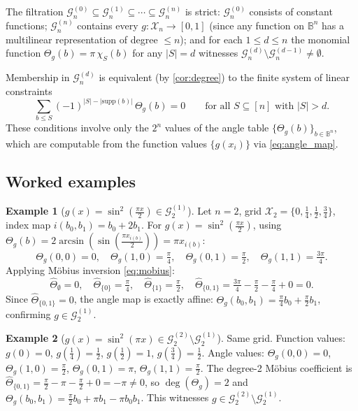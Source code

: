\documentclass[12pt,a4paper]{article}
\theoremstyle{plain}
\theoremstyle{definition}
\newtheorem{example}[example]{Example}
\theoremstyle{remark}
\newcommand{\Gclass}[2]{\mathcal{G}_{#1}^{(#2)}}
\newcommand{\Thetag}{\Theta_g}
\newcommand{\wh}[2]{\hat{#1}_{#2}}
\newcommand{\chimon}[1]{\chi_{#1}}
\begin{document}
The filtration
$\Gclass{n}{0}\subseteq\Gclass{n}{1}\subseteq\cdots\subseteq\Gclass{n}{n}$
is strict: $\Gclass{n}{0}$ consists of constant functions; $\Gclass{n}{n}$
contains every $g:\mathcal{X}_n\to[0,1]$ (since any function on
$\mathbb{B}^n$ has a multilinear representation of degree $\leq n$);
and for each $1\leq d\leq n$ the monomial function
$\Thetag(b) = \pi\,\chimon{S}(b)$ for any $|S|=d$ witnesses
$\Gclass{n}{d}\setminus\Gclass{n}{d-1}\neq\emptyset$.

Membership in $\Gclass{n}{d}$ is equivalent (by \cref{cor:degree}) to
the finite system of linear constraints
\begin{equation}
  \sum_{b\leq S}(-1)^{|S|-|\mathrm{supp}(b)|}\,\Thetag(b) = 0
  \qquad\text{for all }S\subseteq[n]\text{ with }|S|>d.
  \label{eq:membership_conditions}
\end{equation}
These conditions involve only the $2^n$ values of the angle table
$\{\Thetag(b)\}_{b\in\mathbb{B}^n}$, which are computable from the
function values $\{g(x_i)\}$ via \eqref{eq:angle_map}.

\subsection{Worked examples}

\begin{example}[$g(x)=\sin^2(\tfrac{\pi x}{2})\in\Gclass{2}{1}$]
\label{ex:sin2}
Let $n=2$, grid $\mathcal{X}_2=\{0,\tfrac{1}{4},\tfrac{1}{2},\tfrac{3}{4}\}$,
index map $i(b_0,b_1)=b_0+2b_1$.
For $g(x)=\sin^2(\tfrac{\pi x}{2})$, using
$\Thetag(b)=2\arcsin(\sin(\tfrac{\pi x_{i(b)}}{2}))=\pi x_{i(b)}$:
\begin{equation*}
  \Thetag(0,0)=0,\quad
  \Thetag(1,0)=\tfrac{\pi}{4},\quad
  \Thetag(0,1)=\tfrac{\pi}{2},\quad
  \Thetag(1,1)=\tfrac{3\pi}{4}.
\end{equation*}
Applying Möbius inversion \eqref{eq:mobius}:
\begin{equation*}
  \wh{\Theta}{\emptyset}=0,\quad
  \wh{\Theta}{\{0\}}=\tfrac{\pi}{4},\quad
  \wh{\Theta}{\{1\}}=\tfrac{\pi}{2},\quad
  \wh{\Theta}{\{0,1\}}=\tfrac{3\pi}{4}-\tfrac{\pi}{2}-\tfrac{\pi}{4}+0=0.
\end{equation*}
Since $\wh{\Theta}{\{0,1\}}=0$, the angle map is exactly affine:
$\Thetag(b_0,b_1)=\tfrac{\pi}{4}b_0+\tfrac{\pi}{2}b_1$, confirming
$g\in\Gclass{2}{1}$.
\end{example}

\begin{example}[$g(x)=\sin^2(\pi x)\in\Gclass{2}{2}\setminus\Gclass{2}{1}$]
\label{ex:sin2_deg2}
Same grid. Function values:
$g(0)=0$, $g(\tfrac{1}{4})=\tfrac{1}{2}$,
$g(\tfrac{1}{2})=1$, $g(\tfrac{3}{4})=\tfrac{1}{2}$.
Angle values: $\Thetag(0,0)=0$, $\Thetag(1,0)=\tfrac{\pi}{2}$,
$\Thetag(0,1)=\pi$, $\Thetag(1,1)=\tfrac{\pi}{2}$.
The degree-2 Möbius coefficient is
$\wh{\Theta}{\{0,1\}}=\tfrac{\pi}{2}-\pi-\tfrac{\pi}{2}+0=-\pi\neq 0$,
so $\deg(\Thetag)=2$ and
$\Thetag(b_0,b_1)=\tfrac{\pi}{2}b_0+\pi b_1-\pi b_0 b_1$.
This witnesses $g\in\Gclass{2}{2}\setminus\Gclass{2}{1}$.
\end{example}
\end{document}
